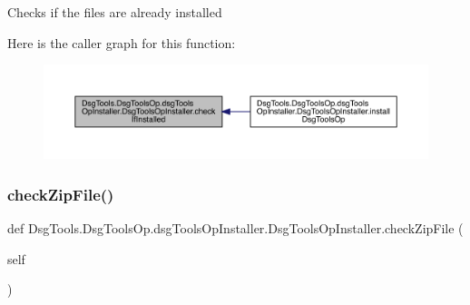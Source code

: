 \begin{DoxyVerb}Checks if the files are already installed
\end{DoxyVerb}
 Here is the caller graph for this function\+:
\nopagebreak
\begin{figure}[H]
\begin{center}
\leavevmode
\includegraphics[width=350pt]{class_dsg_tools_1_1_dsg_tools_op_1_1dsg_tools_op_installer_1_1_dsg_tools_op_installer_a842447891342fd09df0718506c3c69ee_icgraph}
\end{center}
\end{figure}
\mbox{\label{class_dsg_tools_1_1_dsg_tools_op_1_1dsg_tools_op_installer_1_1_dsg_tools_op_installer_a5ee6e9ff77b31248156e53f8af466c35}} 
\subsubsection{\texorpdfstring{check\+Zip\+File()}{checkZipFile()}}
{\footnotesize\ttfamily def Dsg\+Tools.\+Dsg\+Tools\+Op.\+dsg\+Tools\+Op\+Installer.\+Dsg\+Tools\+Op\+Installer.\+check\+Zip\+File (\begin{DoxyParamCaption}\item[{}]{self }\end{DoxyParamCaption})}

